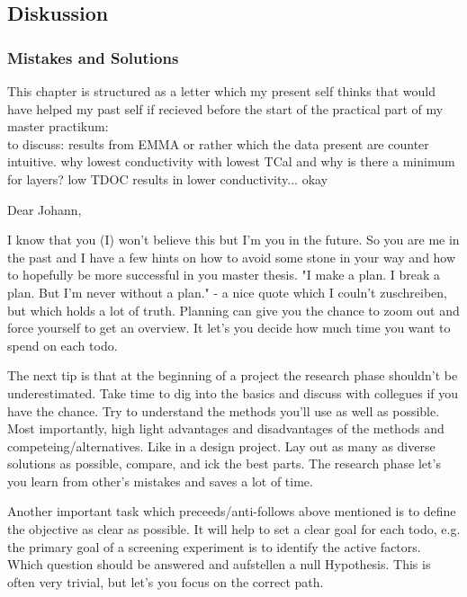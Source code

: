 \subsection{Diskussion}
\subsubsection{Mistakes and Solutions}
This chapter is structured as a letter 
which my present self thinks that would have helped my past self 
if recieved before the start of the practical part of my master practikum:\\

to discuss: results from EMMA or rather which the data present are counter intuitive. 
why lowest conductivity with lowest TCal and why is there a minimum for layers? 
low TDOC results in lower conductivity... okay 


Dear Johann, 

I know that you (I) won't believe this but I'm you in the future. 
So you are me in the past and I have a few hints on how to avoid some stone in your way 
and how to hopefully be more successful in you master thesis. 
"I make a plan. I break a plan. But I'm never without a plan." - a nice quote which I couln't zuschreiben, but which holds a lot of truth. 
Planning can give you the chance to zoom out and force yourself to get an overview. 
It let's you decide how much time you want to spend on each todo. 

The next tip is that at the beginning of a project the research phase shouldn't be underestimated. 
Take time to dig into the basics and discuss with collegues if you have the chance. 
Try to understand the methods you'll use as well as possible. 
Most importantly, high light advantages and disadvantages of the methods and competeing/alternatives. 
Like in a design project. Lay out as many as diverse solutions as possible, 
compare, and ick the best parts.
The research phase let's you learn from other's mistakes and saves a lot of time. 

Another important task which preceeds/anti-follows above mentioned is to define the objective as clear as possible.  
It will help to set a clear goal for each todo, e.g. 
the primary goal of a screening experiment is to identify the active factors.\cite{miller2001using}
Which question should be answered and aufstellen a null Hypothesis. 
This is often very trivial, but let's you focus on the correct path. 

